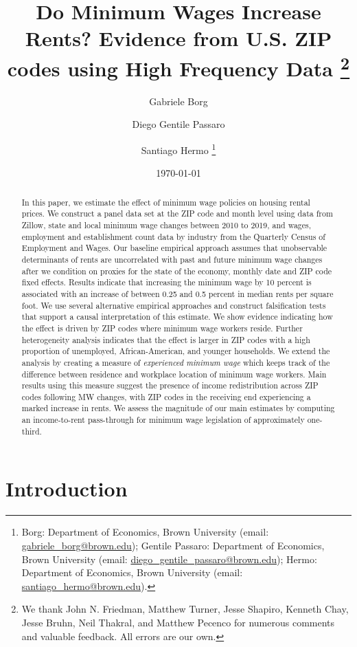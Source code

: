 \documentclass{article}
\title{Do Minimum Wages Increase Rents? 
	   Evidence from U.S. ZIP codes using High Frequency Data 
	   \thanks{We thank John N. Friedman, Matthew Turner, Jesse Shapiro, Kenneth Chay, 
	   	Jesse Bruhn, Neil Thakral, and Matthew Pecenco for numerous comments and 
	   	valuable feedback. All errors are our own.}}
\author{Gabriele Borg \and Diego Gentile Passaro \and Santiago Hermo
		\footnote{Borg: Department of Economics, Brown University (email: 
		\url{gabriele_borg@brown.edu}); 
		Gentile Passaro: Department of Economics, Brown University (email: 
		\url{diego_gentile_passaro@brown.edu}); 
		Hermo: Department of Economics, Brown University (email: 
		\url{santiago_hermo@brown.edu}).}
		}
\date{\today}
\begin{document}
\maketitle

\begin{abstract}
    \noindent
    In this paper, we estimate the effect of minimum wage policies on housing rental 
    prices. We construct a panel data set at the ZIP code and month level using data 
    from Zillow, state and local minimum wage changes between 2010 to 2019, and wages, 
    employment and establishment count data by industry from the Quarterly Census of 
    Employment and Wages. Our baseline empirical approach assumes that unobservable 
    determinants of rents are uncorrelated with past and future minimum wage changes 
    after we condition on proxies for the state of the economy, monthly date and ZIP 
    code fixed  effects. Results indicate that increasing the minimum wage by 10 percent 
    is associated with an increase of between 0.25 and 0.5 percent in median rents per 
    square foot. We use several alternative empirical approaches and construct 
    falsification tests that support a causal interpretation of this estimate. We show 
    evidence indicating how the effect is driven by ZIP codes where minimum wage workers 
    reside. Further heterogeneity analysis indicates that the effect is larger in ZIP 
    codes with a high proportion of unemployed, African-American, and younger households. 
    We extend the analysis by creating a measure of \textit{experienced minimum wage} 
    which keeps track of the difference between residence and workplace location of 
    minimum wage workers. Main results using this measure suggest the presence of income 
    redistribution across ZIP codes following MW changes, with ZIP codes in
    the receiving end experiencing a marked increase in rents. We assess the magnitude
    of our main estimates by computing an income-to-rent pass-through for minimum wage 
    legislation of approximately one-third. 
\end{abstract}

\vspace{5mm}

\maketitle


\clearpage

\section{Introduction}\label{sec:intro}
    
\end{document}
